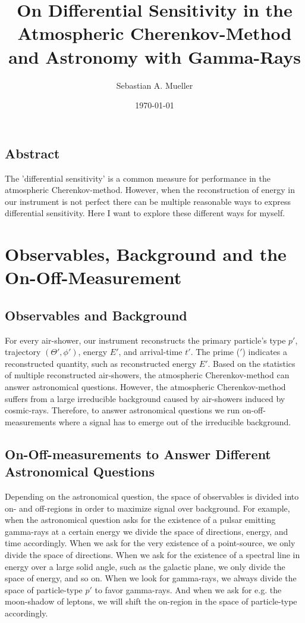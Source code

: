 \documentclass{article}%
\title{
    On Differential Sensitivity in the Atmospheric Cherenkov-Method and Astronomy with Gamma-Rays
}%
\author{Sebastian A. Mueller}%
\date{\today{}}%
\begin{document}
%
\maketitle%
%
\newcommand{\dd}[2]{\frac{\mathrm{d}#1}{\mathrm{d}#2}}
%
\subsection*{Abstract}
The 'differential sensitivity' is a common measure for performance in the atmospheric Cherenkov-method.
%
However, when the reconstruction of energy in our instrument is not perfect there can be multiple reasonable ways to express differential sensitivity.
%
Here I want to explore these different ways for myself.
%
\section{Observables, Background and the On-Off-Measurement}
\label{SecObservablesAndOnOff}
\subsection*{Observables and Background}
%
For every air-shower, our instrument reconstructs the primary particle's type $p'$, trajectory $(\Theta', \phi')$, energy $E'$, and arrival-time $t'$.
%
The prime ($'$) indicates a reconstructed quantity, such as reconstructed energy $E'$.
%
Based on the statistics of multiple reconstructed air-showers, the atmospheric Cherenkov-method can answer astronomical questions.
%
However, the atmospheric Cherenkov-method suffers from a large irreducible background caused by air-showers induced by cosmic-rays.
%
Therefore, to answer astronomical questions we run on-off-measurements where a signal has to emerge out of the irreducible background.
%
\subsection*{On-Off-measurements to Answer Different Astronomical Questions}
Depending on the astronomical question, the space of observables is divided into on- and off-regions in order to maximize signal over background.
%
For example, when the astronomical question asks for the existence of a pulsar emitting gamma-rays at a certain energy we divide the space of directions, energy, and time accordingly.
%
When we ask for the very existence of a point-source, we only divide the space of directions.
%
When we ask for the existence of a spectral line in energy over a large solid angle, such as the galactic plane, we only divide the space of energy, and so on.
%
When we look for gamma-rays, we always divide the space of particle-type $p'$ to favor gamma-rays.
%
And when we ask for e.g. the moon-shadow of leptons, we will shift the on-region in the space of particle-type accordingly.
%
\end{document}

